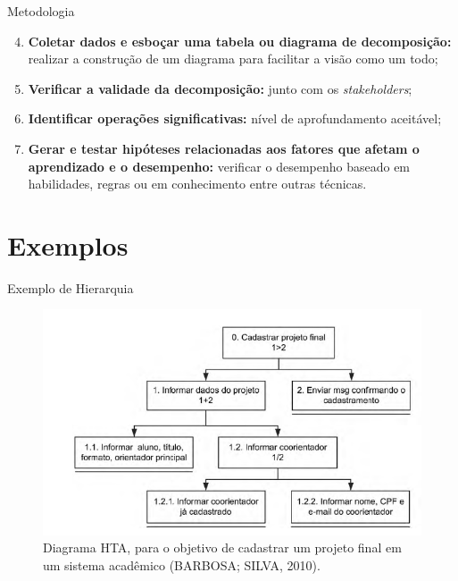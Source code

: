 \documentclass[xcolor=dvipsnames]{beamer}
\let\olditem=\item%
\renewcommand{\item}{\olditem \justifying}%
\begin{document}
\begin{frame}{Metodologia}
                
	\begin{enumerate}

		\setcounter{enumi}{3}

		\item \textbf{Coletar dados e esboçar uma tabela ou diagrama de decomposição:} realizar a construção de um diagrama para facilitar a visão como um todo;

		\bigskip

		\item \textbf{Verificar a validade da decomposição:} junto com os \textit{stakeholders};

		\bigskip

		\item \textbf{Identificar operações significativas:} nível de aprofundamento aceitável;

		\bigskip            

		\item \textbf{Gerar e testar hipóteses relacionadas aos fatores que afetam o aprendizado e o desempenho:} verificar o desempenho baseado em habilidades, regras ou em conhecimento entre outras técnicas.

	\end{enumerate}
        
\end{frame}




\section{Exemplos}



\begin{frame}{Exemplo de Hierarquia}

	\begin{figure}[H]
    
		\centering
		\caption{Diagrama HTA, para o objetivo de cadastrar um projeto final em um sistema acadêmico (BARBOSA; SILVA, 2010).}
		\label{fig:HTAExHi}
		\includegraphics[width=0.8\linewidth]{img/hierarquia}
        
	\end{figure}
    
\end{frame}
\end{document}
